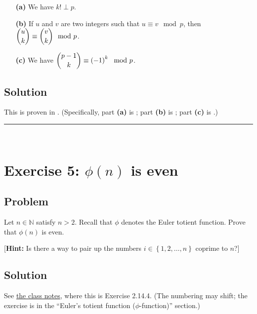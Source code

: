 \documentclass[paper=a4, fontsize=12pt]{scrartcl} %
\newcommand{\NN}{\mathbb{N}} %
\newcommand{\set}[1]{\left\{ #1 \right\}}
\newcommand{\tup}[1]{\left( #1 \right)}
\newcommand{\horrule}[1]{\rule{\linewidth}{#1}} %
\theoremstyle{plainsl}
\theoremstyle{definition}
\theoremstyle{remark}
\begin{document}
\begin{enumerate}

\item[\textbf{(a)}]
We have $k! \perp p$.

\item[\textbf{(b)}]
If $u$ and $v$ are two integers such that $u \equiv v \mod p$,
then
$\dbinom{u}{k} \equiv \dbinom{v}{k} \mod p$.

\item[\textbf{(c)}]
We have $\dbinom{p-1}{k} \equiv \tup{-1}^k \mod p$.

\end{enumerate}

\subsection{Solution}

This is proven in \cite[Section 5]{fleck}.
(Specifically, part \textbf{(a)} is \cite[Lemma 5.2]{fleck};
part \textbf{(b)} is \cite[Proposition 5.5]{fleck};
part \textbf{(c)} is \cite[Proposition 3.1]{fleck}.)

\horrule{0.3pt} \\[0.4cm]

\section{Exercise 5: $\phi\tup{n}$ is even}

\subsection{Problem}

Let $n \in \NN$ satisfy $n > 2$.
Recall that $\phi$ denotes the Euler totient function.
Prove that $\phi\tup{n}$ is even.

[\textbf{Hint:} Is there a way to pair up the numbers
$i \in \set{1, 2, \ldots, n}$ coprime to $n$?]

\subsection{Solution}

See
\href{http://www-users.math.umn.edu/~dgrinber/19s/notes.pdf}{the class notes},
where this is Exercise 2.14.4.
(The numbering may shift; the exercise is in the
``Euler's totient function ($\phi$-function)''
section.)
\end{document}
